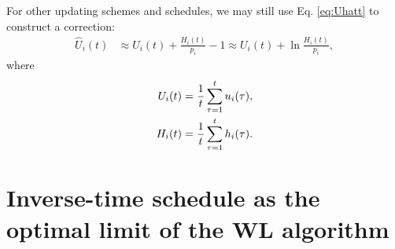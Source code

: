 \documentclass[reprint, superscriptaddress, floatfix]{revtex4-1}
\begin{document}
For other updating schemes and schedules, we may still use
Eq. \eqref{eq:Uhatt} to construct a correction:
%
\begin{align}
  \hat U_i(t)
  &\approx
  U_i(t)
  +
  \frac{ H_i(t) } { p_i } - 1
  \approx
  U_i(t)
  +
  \ln \frac{ H_i(t) } { p_i }
  ,
  \label{eq:UHcorr}
\end{align}
%
where
\begin{align}
  U_i(t)
  &= \frac 1 t \sum_{\tau = 1}^t u_i(\tau)
  ,
  \notag
  \\
  H_i(t)
  &= \frac 1 t \sum_{\tau = 1}^t h_i(\tau)
  .
  \label{eq:hav_def}
\end{align}
%



%




\section{\label{sec:wltoinvt}
Inverse-time schedule as the optimal limit of the WL algorithm}
\end{document}

